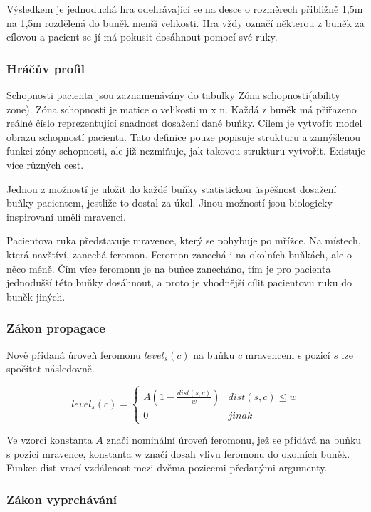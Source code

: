 Výsledkem je jednoduchá hra odehrávající se na desce o rozměrech přibližně 1,5m na 1,5m rozdělená do buněk menší velikosti. Hra vždy označí některou z buněk za cílovou a pacient se jí má pokusit dosáhnout pomocí své ruky.

\subsubsection{Hráčův profil}

Schopnosti pacienta jsou zaznamenávány do tabulky Zóna schopnosti(ability zone). Zóna schopnosti je matice o velikosti m x n. Každá z buněk má přiřazeno reálné číslo reprezentující snadnost dosažení dané buňky. Cílem je vytvořit model obrazu schopností pacienta.
Tato definice pouze popisuje strukturu a zamýšlenou funkci zóny schopnosti, ale již nezmiňuje, jak takovou strukturu vytvořit. Existuje více různých cest.

Jednou z možností je uložit do každé buňky statistickou úspěšnost dosažení buňky pacientem, jestliže to dostal za úkol. Jinou možností jsou biologicky inspirovaní umělí mravenci.

Pacientova ruka představuje mravence, který se pohybuje po mřížce. Na místech, která navštíví, zanechá feromon. Feromon zanechá i na okolních buňkách, ale o něco méně. Čím více feromonu je na buňce zanecháno, tím je pro pacienta jednodušší této buňky dosáhnout, a proto je vhodnější cílit pacientovu ruku do buněk jiných.

\subsubsection{Zákon propagace}

Nově přidaná úroveň feromonu $level_s(c)$ na buňku $c$ mravencem s pozicí $s$ lze spočítat následovně.


\begin{equation}
	level_s(c)= \begin{cases}
											  A(1-\frac{dist(s, c)}{w}) & dist(s, c) \leq w \\
												0 & jinak
										 \end{cases}
\end{equation}

Ve vzorci konstanta $A$ značí nominální úroveň feromonu, jež se přidává na buňku s pozicí mravence, konstanta w značí dosah vlivu feromonu do okolních buněk. Funkce dist vrací vzdálenost mezi dvěma pozicemi předanými argumenty.

\subsubsection{Zákon vyprchávání}

